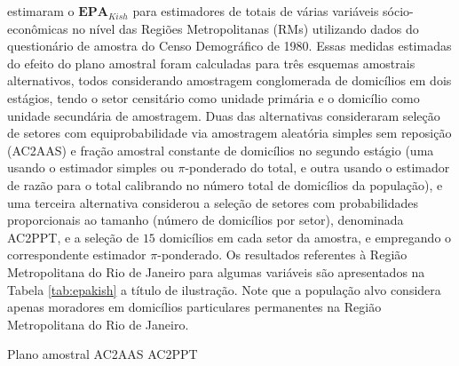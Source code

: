 \documentclass[]{book}
\theoremstyle{definition}
\theoremstyle{definition}
\theoremstyle{definition}
\theoremstyle{remark}
\begin{document}
\citep{SilvaMou} estimaram o \(\mathbf{EPA}_{Kish}\) para estimadores de
totais de várias variáveis sócio-econômicas no nível das Regiões
Metropolitanas (RMs) utilizando dados do questionário de amostra do
Censo Demográfico de 1980. Essas medidas estimadas do efeito do plano
amostral foram calculadas para três esquemas amostrais alternativos,
todos considerando amostragem conglomerada de domicílios em dois
estágios, tendo o setor censitário como unidade primária e o domicílio
como unidade secundária de amostragem. Duas das alternativas
consideraram seleção de setores com equiprobabilidade via amostragem
aleatória simples sem reposição (AC2AAS) e fração amostral constante de
domicílios no segundo estágio (uma usando o estimador simples ou
\(\pi\)-ponderado do total, e outra usando o estimador de razão para o
total calibrando no número total de domicílios da população), e uma
terceira alternativa considerou a seleção de setores com probabilidades
proporcionais ao tamanho (número de domicílios por setor), denominada
AC2PPT, e a seleção de \(15\) domicílios em cada setor da amostra, e
empregando o correspondente estimador \(\pi\)-ponderado. Os resultados
referentes à Região Metropolitana do Rio de Janeiro para algumas
variáveis são apresentados na Tabela \ref{tab:epakish} a título de
ilustração. Note que a população alvo considera apenas moradores em
domicílios particulares permanentes na Região Metropolitana do Rio de
Janeiro.

Plano amostral AC2AAS AC2PPT
\end{document}
